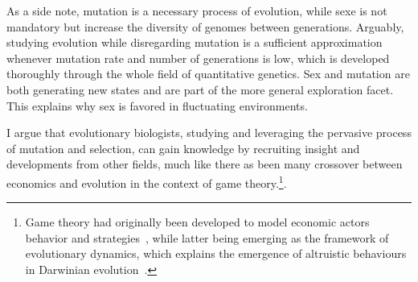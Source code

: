 \begin{table}[H]
    \centering
    \noindent{}
    \caption[Mutation, selection and drift analogy]{
    Mutation, selection and drift lexicographic rephrasing in different fields.
    }
    \label{table:intro-mutsel-analogy}
\end{table}

As a side note, mutation is a necessary process of evolution, while sexe is not mandatory but increase the diversity of genomes between generations.
Arguably, studying evolution while disregarding mutation is a sufficient approximation whenever mutation rate and number of generations is low, which is developed thoroughly through the whole field of quantitative genetics.
Sex and mutation are both generating new states and are part of the more general exploration facet.
This explains why sex is favored in fluctuating environments.

I argue that evolutionary biologists, studying and leveraging the pervasive process of mutation and selection, can gain knowledge by recruiting insight and developments from other fields, much like there as been many crossover between economics and evolution in the context of game theory.\footnote{Game theory had originally been developed to model economic actors behavior and strategies~\citep{VonNeumann1947}, while latter being emerging as the framework of evolutionary dynamics, which explains the emergence of altruistic behaviours in Darwinian evolution~\citep{Smith1973, Smith1982, Nowak2006}.}.

